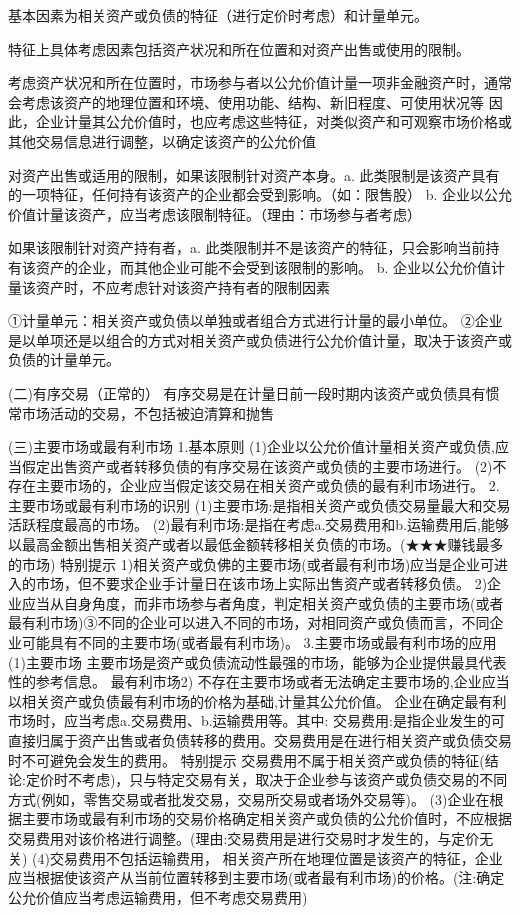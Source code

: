 \documentclass[UTF8,12pt]{ctexart}
\numberwithin{equation}{section} %
\numberwithin{figure}{section}
\numberwithin{table}{section}
\begin{document}
	基本因素为相关资产或负债的特征（进行定价时考虑）和计量单元。
	
	特征上具体考虑因素包括资产状况和所在位置和对资产出售或使用的限制。
	
	考虑资产状况和所在位置时，市场参与者以公允价值计量一项非金融资产时，通常会考虑该资产的地理位置和环境、使用功能、结构、新旧程度、可使用状况等
	因此，企业计量其公允价值时，也应考虑这些特征，对类似资产和可观察市场价格或其他交易信息进行调整，以确定该资产的公允价值
	
	对资产出售或适用的限制，如果该限制针对资产本身。a.	此类限制是该资产具有的一项特征，任何持有该资产的企业都会受到影响。（如：限售股）
	b.	企业以公允价值计量该资产，应当考虑该限制特征。（理由：市场参与者考虑）
	
	如果该限制针对资产持有者，a.	此类限制并不是该资产的特征，只会影响当前持有该资产的企业，而其他企业可能不会受到该限制的影响。
	b.	企业以公允价值计量该资产时，不应考虑针对该资产持有者的限制因素
	
	①计量单元：相关资产或负债以单独或者组合方式进行计量的最小单位。
	②企业是以单项还是以组合的方式对相关资产或负债进行公允价值计量，取决于该资产或负债的计量单元。
	
	(二)有序交易（正常的）
	有序交易是在计量日前一段时期内该资产或负债具有惯常市场活动的交易，不包括被迫清算和抛售
	
	(三)主要市场或最有利市场
	1.基本原则
	(1)企业以公允价值计量相关资产或负债,应当假定出售资产或者转移负债的有序交易在该资产或负债的主要市场进行。
	(2)不存在主要市场的，企业应当假定该交易在相关资产或负债的最有利市场进行。
	2.主要市场或最有利市场的识别
	(1)主要市场:是指相关资产或负债交易量最大和交易活跃程度最高的市场。
	(2)最有利市场:是指在考虑a.交易费用和b.运输费用后,能够以最高金额出售相关资产或者以最低金额转移相关负债的市场。(★★★赚钱最多的市场)
	特别提示
	1)相关资产或负佛的主要市场(或者最有利市场)应当是企业可进入的市场，但不要求企业手计量日在该市场上实际出售资产或者转移负债。
	2)企业应当从自身角度，而非市场参与者角度，判定相关资产或负债的主要市场(或者最有利市场)③不同的企业可以进入不同的市场，对相同资产或负债而言，不同企业可能具有不同的主要市场(或者最有利市场)。
	3.主要市场或最有利市场的应用
	(1)主要市场
	主要市场是资产或负债流动性最强的市场，能够为企业提供最具代表性的参考信息。
	最有利市场2)
	不存在主要市场或者无法确定主要市场的,企业应当以相关资产或负债最有利市场的价格为基础,计量其公允价值。
	企业在确定最有利市场时，应当考虑a.交易费用、b.运输费用等。其中:
	交易费用:是指企业发生的可直接归属于资产出售或者负债转移的费用。交易费用是在进行相关资产或负债交易时不可避免会发生的费用。
	特别提示
	交易费用不属于相关资产或负债的特征(结论:定价时不考虑)，只与特定交易有关，取决于企业参与该资产或负债交易的不同方式(例如，零售交易或者批发交易，交易所交易或者场外交易等)。
	(3)企业在根据主要市场或最有利市场的交易价格确定相关资产或负债的公允价值时，不应根据交易费用对该价格进行调整。(理由:交易费用是进行交易时才发生的，与定价无关)
	(4)交易费用不包括运输费用，
	相关资产所在地理位置是该资产的特征，企业应当根据使该资产从当前位置转移到主要市场(或者最有利市场)的价格。(注:确定公允价值应当考虑运输费用，但不考虑交易费用)
	
\end{document}
